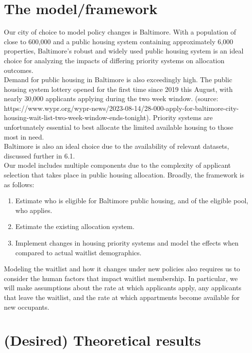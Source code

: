 \documentclass[11pt]{article}
\begin{document}
\section{The model/framework}
\noindent
Our city of choice to model policy changes is Baltimore. With a population of close to 600,000 and a public housing system containing approximately 6,000 properties, Baltimore's robust and widely used public housing system is an ideal choice for analyzing the impacts of differing priority systems on allocation outcomes. \\
\newline
Demand for public housing in Baltimore is also exceedingly high. The public housing system lottery opened for the first time since 2019 this August, with nearly 30,000 applicants applying during the two week window. (source: https://www.wypr.org/wypr-news/2023-08-14/28-000-apply-for-baltimore-city-housing-wait-list-two-week-window-ends-tonight). Priority systems are unfortunately essential to best allocate the limited available housing to those most in need. \\
\newline
Baltimore is also an ideal choice due to the availability of relevant datasets, discussed further in 6.1. \\
\newline 
Our model includes multiple components due to the complexity of applicant selection that takes place in public housing allocation. Broadly, the framework is as follows:
\begin{enumerate}
    \item Estimate who is eligible for Baltimore public housing, and of the eligible pool, who applies.
    \item Estimate the existing allocation system.
    \item Implement changes in housing priority systems and model the effects when compared to actual waitlist demographics.
\end{enumerate}
Modeling the waitlist and how it changes under new policies also requires us to consider the human factors that impact waitlist membership. In particular, we will make assumptions about the rate at which applicants apply, any applicants that leave the waitlist, and the rate at which appartments become available for new occupants. 


\section{(Desired) Theoretical results}
\end{document}
